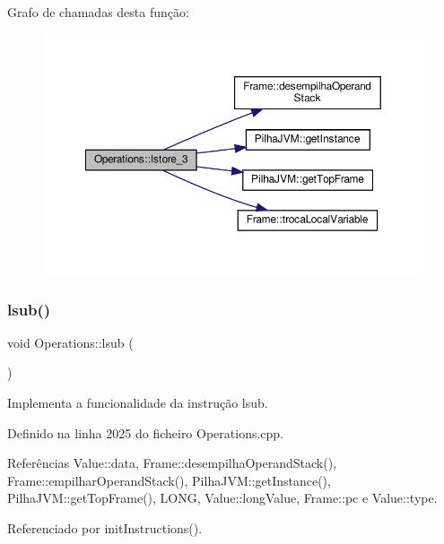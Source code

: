 Grafo de chamadas desta função\+:
\nopagebreak
\begin{figure}[H]
\begin{center}
\leavevmode
\includegraphics[width=350pt]{classOperations_a00d5ca7ea5a68e9cccfdc26b11a716bf_cgraph}
\end{center}
\end{figure}
\mbox{\label{classOperations_a32485b21761b1e5540a6575822a2661a}} 
\subsubsection{\texorpdfstring{lsub()}{lsub()}}
{\footnotesize\ttfamily void Operations\+::lsub (\begin{DoxyParamCaption}{ }\end{DoxyParamCaption})\hspace{0.3cm}{\ttfamily [private]}}



Implementa a funcionalidade da instrução lsub. 



Definido na linha 2025 do ficheiro Operations.\+cpp.



Referências Value\+::data, Frame\+::desempilha\+Operand\+Stack(), Frame\+::empilhar\+Operand\+Stack(), Pilha\+J\+V\+M\+::get\+Instance(), Pilha\+J\+V\+M\+::get\+Top\+Frame(), L\+O\+NG, Value\+::long\+Value, Frame\+::pc e Value\+::type.



Referenciado por init\+Instructions().

